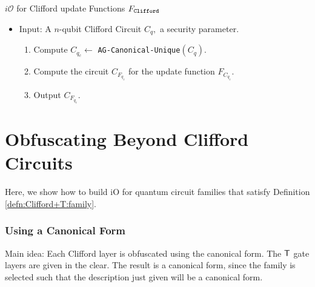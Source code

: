\begin{algorithm}[H]
   \caption{$i\mathcal{O}$ for Clifford update Functions $F_{\tt Clifford}$}
  \begin{itemize}
  \item Input: A $n$-qubit Clifford Circuit $C_q,$ a security parameter.
  \begin{enumerate}
  \item Compute $C_{q_c}\leftarrow$ {\tt AG-Canonical-Unique}$(C_q).$
  \item Compute the circuit $C_{F_{q_c}}$ for the update function $F_{C_{q_c}}.$
  \item Output $C_{F_{q_c}}.$
  \end{enumerate}
  \end{itemize} 
\end{algorithm}

\section{Obfuscating Beyond Clifford Circuits}
Here, we show how to build iO for quantum circuit families that satisfy Definition \ref{defn:Clifford+T:family}.

\subsubsection{Using a Canonical Form}
Main idea: Each Clifford layer is obfuscated using the canonical form. The ${\sf T}$ gate layers are given in the clear. The result is a canonical form, since the family is selected such that the description just given will be a canonical form.


